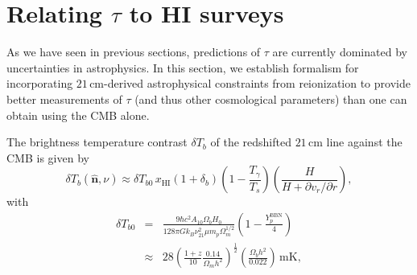 \documentclass[twocolumn,aps,prd,nofootinbib,showpacs]{revtex4-1}
\begin{document}
\section{Relating $\tau$ to HI surveys}
\label{eq:Pkformalism}

As we have seen in previous sections, predictions of $\tau$ are currently dominated by uncertainties in astrophysics. In this section, we establish formalism for incorporating $21\,\textrm{cm}$-derived astrophysical constraints from reionization to provide better measurements of $\tau$ (and thus other cosmological parameters) than one can obtain using the CMB alone.

The brightness temperature contrast $\delta T_b$ of the redshifted $21\,\textrm{cm}$ line against the CMB is given by \cite{furlanetto_et_al2006,aviBook}
\begin{equation}
\label{eq:deltaTdef}
\delta T_b(\mathbf{\hat{n}}, \nu) \approx \delta T_{b0}\, x_\textrm{HI}  (1 + \delta_b) \left( 1 - \frac{T_\gamma}{T_s}\right)\!\left( \frac{H}{H+ \partial v_r / \partial r} \right),
\end{equation}
with
\begin{eqnarray}
\label{eq:TbPrefactor}
\delta T_{b0} &=&  \frac{9\hbar c^2 A_{10}\Omega_b H_0}{128 \pi G k_B \nu_{21}^2 \mu m_p\Omega_m^{1/2}} \left(1 - \frac{Y_p^\textrm{BBN}}{4} \right) \nonumber \\
&\approx& 28 \left( \frac{1+z}{10} \frac{0.14}{\Omega_m h^2} \right)^\frac{1}{2} \left( \frac{\Omega_b h^2}{0.022}\right)\,\textrm{mK},
\end{eqnarray}
\end{document}
